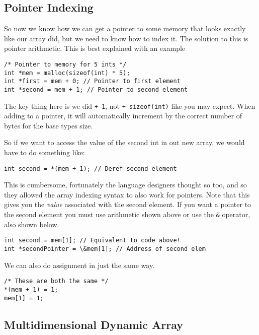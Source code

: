 \subsection{Pointer Indexing}

So now we know how we can get a pointer to some memory that looks exactly like our array did, but we need to know how to index it.
The solution to this is pointer arithmetic.
This is best explained with an example

\begin{lstlisting}
/* Pointer to memory for 5 ints */
int *mem = malloc(sizeof(int) * 5); 
int *first = mem + 0; // Pointer to first element 
int *second = mem + 1; // Pointer to second element
\end{lstlisting}

The key thing here is we did \texttt{+ 1}, not \texttt{+ sizeof(int)} like you may expect.
When adding to a pointer, it will automatically increment by the correct number of bytes for the base types size.

So if we want to access the value of the second int in out new array, we would have to do something like:

\begin{lstlisting}[numbers=none,frame=none]
int second = *(mem + 1); // Deref second element
\end{lstlisting}

This is cumbersome, fortunately the language designers thought so too, and so they allowed the array indexing syntax to also work for pointers.
Note that this gives you the \emph{value} associated with the second element.
If you want a pointer to the second element you must use arithmetic shown above or use the \texttt{\&} operator, also shown below.

\begin{lstlisting}[numbers=none,frame=none]
int second = mem[1]; // Equivalent to code above!
int *secondPointer = \&mem[1]; // Address of second elem
\end{lstlisting}

We can also do assignment in just the same way.

\begin{lstlisting}
/* These are both the same */
*(mem + 1) = 1;
mem[1] = 1; 
\end{lstlisting}

\subsection{Multidimensional Dynamic Array}

